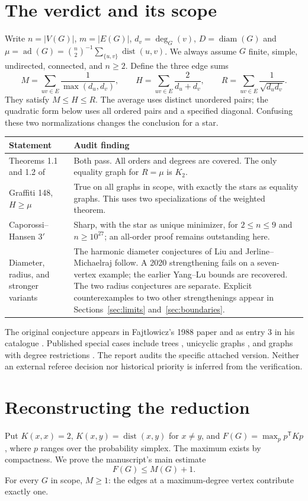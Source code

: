 \documentclass[11pt,a4paper]{article}
\theoremstyle{remark}\newtheorem*{remark}{Remark}
\newcommand{\ad}{\operatorname{ad}}
\newcommand{\diam}{\operatorname{diam}}
\DeclareMathOperator{\dist}{dist}
\begin{document}
\section{The verdict and its scope}
Write $n=|V(G)|$, $m=|E(G)|$, $d_v=\deg_G(v)$, $D=\diam(G)$ and $\mu=\ad(G)=\binom n2^{-1}\sum_{\{u,v\}}\dist(u,v)$. We always assume $G$ finite, simple, undirected, connected, and $n\ge2$. Define the three edge sums
\[
 M=\sum_{uv\in E}\frac1{\max(d_u,d_v)},\qquad
 H=\sum_{uv\in E}\frac2{d_u+d_v},\qquad
 R=\sum_{uv\in E}\frac1{\sqrt{d_ud_v}} .
\]
They satisfy $M\le H\le R$. The average uses distinct unordered pairs; the quadratic form below uses all ordered pairs and a specified diagonal. Confusing these two normalizations changes the conclusion for a star.
\begin{center}\small
\begin{tabular}{@{}p{.38\linewidth}p{.565\linewidth}@{}}\toprule
Statement & Audit finding\\\midrule
Theorems 1.1 and 1.2 of \cite{audited}& Both pass. All orders and degrees are covered. The only equality graph for $R=\mu$ is $K_2$.\\[3pt]
Graffiti 148, $H\ge\mu$ \cite{wow}& True on all graphs in scope, with exactly the stars as equality graphs. This uses two specializations of the weighted theorem.\\[3pt]
Caporossi--Hansen $3'$ \cite{cap}& Sharp, with the star as unique minimizer, for $2\le n\le9$ and $n\ge10^{27}$; an all-order proof remains outstanding here.\\[3pt]
Diameter, radius, and stronger variants & The harmonic diameter conjectures of Liu and Jerline--Michaelraj follow. A 2020 strengthening fails on a seven-vertex example; the earlier Yang--Lu bounds are recovered. The two radius conjectures are separate. Explicit counterexamples to two other strengthenings appear in Sections~\ref{sec:limits} and~\ref{sec:boundaries}.\\\bottomrule
\end{tabular}\end{center}
\noindent The original conjecture appears in Fajtlowicz's 1988 paper and as entry 3 in his catalogue \cite{faj,wow}. Published special cases include trees \cite{tree}, unicyclic graphs \cite{uni}, and graphs with degree restrictions \cite{dalfo}. The report audits the specific attached version. Neither an external referee decision nor historical priority is inferred from the verification.
\section{Reconstructing the reduction}
Put $K(x,x)=2$, $K(x,y)=\dist(x,y)$ for $x\ne y$, and $F(G)=\max_{p}p^{\mathsf T}Kp$, where $p$ ranges over the probability simplex. The maximum exists by compactness. We prove the manuscript's main estimate
\begin{equation} F(G)\le M(G)+1.\label{weighted}\tag{W}\end{equation}
For every $G$ in scope, $M\ge1$: the edges at a maximum-degree vertex contribute exactly one.
\end{document}
